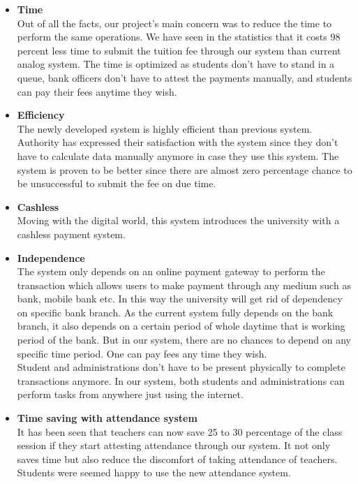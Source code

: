 \begin{itemize}

\item \textbf{Time}\\
Out of all the facts, our project's main concern was to reduce the time to perform the same operations. We have seen in the statistics that it costs 98 percent less time to submit the tuition fee through our system than current analog system. The time is optimized as students don't have to stand in a queue, bank officers don't have to attest the payments manually, and students can pay their fees anytime they wish.

\item \textbf{Efficiency}\\
The newly developed system is highly efficient than previous system. Authority has expressed their satisfaction with the system since they don't have to calculate data manually anymore in case they use this system. The system is proven to be better since there are almost zero percentage chance to be unsuccessful to submit the fee on due time.

\item \textbf{Cashless}\\
Moving with the digital world, this system introduces the university with a cashless payment system.

\item \textbf{Independence}\\
The system only depends on an online payment gateway to perform the transaction which allows users to make payment through any medium such as bank, mobile bank etc. In this way the university will get rid of dependency on specific bank branch. As the current system fully depends on the bank branch, it also depends on a certain period of whole daytime that is working period of the bank. But in our system, there are no chances to depend on any specific time period. One can pay fees any time they wish.\\
Student and administrations don't have to be present physically to complete transactions anymore. In our system, both students and administrations can perform tasks from anywhere just using the internet.

\item \textbf{Time saving with attendance system}\\
It has been seen that teachers can now save 25 to 30 percentage of the class session if they start attesting attendance through our system. It not only saves time but also reduce the discomfort of taking attendance of teachers. Students were seemed happy to use the new attendance system.


\end{itemize}
